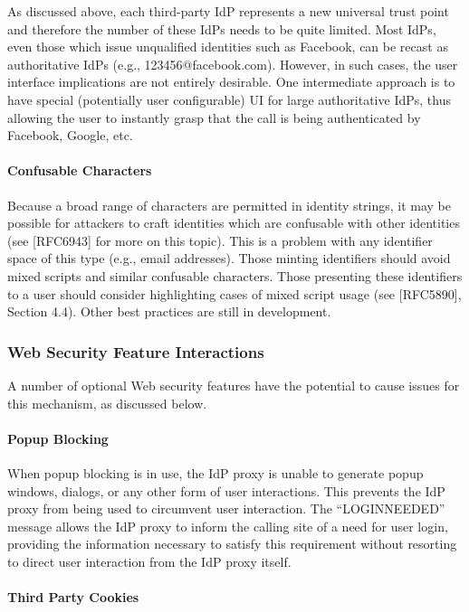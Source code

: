 \documentclass{article}
\begin{document}
As discussed above, each third-party IdP represents a new universal
trust point and therefore the number of these IdPs needs to be quite
limited.  Most IdPs, even those which issue unqualified identities
such as Facebook, can be recast as authoritative IdPs (e.g.,
123456@facebook.com).  However, in such cases, the user interface
implications are not entirely desirable.  One intermediate approach
is to have special (potentially user configurable) UI for large
authoritative IdPs, thus allowing the user to instantly grasp that
the call is being authenticated by Facebook, Google, etc.

\paragraph{Confusable Characters}

Because a broad range of characters are permitted in identity
strings, it may be possible for attackers to craft identities which
are confusable with other identities (see [RFC6943] for more on this
topic).  This is a problem with any identifier space of this type
(e.g., email addresses).  Those minting identifiers should avoid
mixed scripts and similar confusable characters.  Those presenting
these identifiers to a user should consider highlighting cases of
mixed script usage (see [RFC5890], Section 4.4).  Other best
practices are still in development.

\subsubsection{Web Security Feature Interactions}

A number of optional Web security features have the potential to
cause issues for this mechanism, as discussed below.

\paragraph{Popup Blocking}

When popup blocking is in use, the IdP proxy is unable to generate
popup windows, dialogs, or any other form of user interactions.  This
prevents the IdP proxy from being used to circumvent user
interaction.  The ``LOGINNEEDED'' message allows the IdP proxy to
inform the calling site of a need for user login, providing the
information necessary to satisfy this requirement without resorting
to direct user interaction from the IdP proxy itself.

\paragraph{Third Party Cookies}
\end{document}
